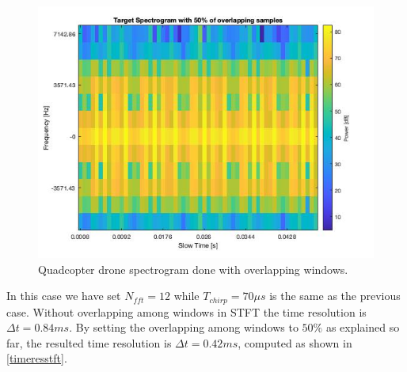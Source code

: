 \begin{figure}[h!]
\centering
\includegraphics[width=12cm]{FMCW mD analysis-chap4/img/spect_quad_50_perc_overlap.jpg}
\caption{Quadcopter drone spectrogram done with overlapping windows.}
\label{quadspectexample}
\end{figure}

In this case we have set $N_{fft}=12$ while $T_{chirp} = 70\mu s$ is the same as the previous case. Without overlapping among windows in STFT the time resolution is $\Delta t = 0.84 ms$. By setting the overlapping among windows to $50\%$ as explained so far,
the resulted time resolution is $\Delta t = 0.42 ms$, computed as shown in \ref{timeresstft}.

